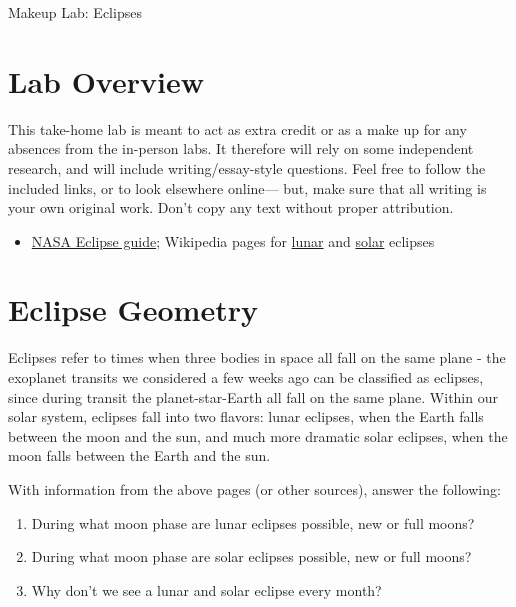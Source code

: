 \documentclass[12pt]{article}
\begin{document}
\thispagestyle{empty}

\begin{center}
\huge{Makeup Lab: Eclipses}\\
\end{center}

\section{Lab Overview}
This take-home lab is meant to act as extra credit or as a make up for any absences from the in-person labs. It therefore will rely on some independent research, and will include writing/essay-style questions. Feel free to follow the included links, or to look elsewhere online— but, make sure that all writing is your own original work. Don't copy any text without proper attribution.

\begin{itemize}
    \item \href{https://science.nasa.gov/moon/eclipses/}{NASA Eclipse guide}; Wikipedia pages for \href{https://en.wikipedia.org/wiki/Lunar_eclipse}{lunar} and \href{https://en.wikipedia.org/wiki/Solar_eclipse}{solar} eclipses
\end{itemize}

\section{Eclipse Geometry}


Eclipses refer to times when three bodies in space all fall on the same plane - the exoplanet transits we considered a few weeks ago can be classified as eclipses, since during transit the planet-star-Earth all fall on the same plane. Within our solar system, eclipses fall into two flavors: lunar eclipses, when the Earth falls between the moon and the sun, and much more dramatic solar eclipses, when the moon falls between the Earth and the sun. 

With information from the above pages (or other sources), answer the following:
\begin{enumerate}
    \item During what moon phase are lunar eclipses possible, new or full moons?
    \item During what moon phase are solar eclipses possible, new or full moons?
    \item Why don't we see a lunar and solar eclipse every month?
\end{enumerate}
\end{document}
